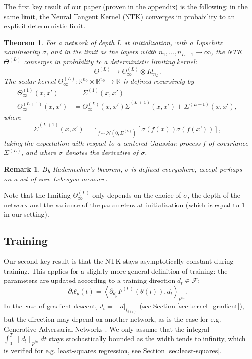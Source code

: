 \documentclass{article}
\newtheorem{thm}{Theorem}
\newtheorem{rem}{Remark}
\begin{document}
The first key result of our paper (proven in the appendix) is the following: in the same limit, the Neural Tangent Kernel (NTK) converges in probability to an explicit deterministic limit. 
\begin{thm}\label{thm:convergence_NTK_initialization}
For a network of depth $L$ at initialization, with a Lipschitz nonlinearity $\sigma$, and in the limit as the layers width $n_1, ..., n_{L-1} \to \infty$, the NTK $\Theta^{(L)}$ converges in probability to a deterministic limiting kernel: $$\Theta^{(L)} \to \Theta^{(L)}_\infty \otimes Id_{n_L}.$$
The scalar kernel $\Theta^{(L)}_\infty : \mathbb{R}^{n_0} \times \mathbb{R}^{n_0} \to \mathbb{R}$ is defined recursively by
\begin{align*}
    \Theta^{(1)}_\infty(x, x') &= \Sigma^{(1)}(x, x') \\
    \Theta^{(L+1)}_\infty(x, x') &=  \Theta^{(L)}_\infty(x, x') \dot{\Sigma}^{(L+1)}(x, x')  + \Sigma^{(L+1)}(x, x'),
\end{align*}
where
\[
	\dot{\Sigma}^{(L+1)}\left(x,x'\right)=
	\mathbb{E}_{f\sim\mathcal{N}\left(0,\Sigma^{\left(L\right)}\right)}\left[\dot{\sigma}\left(f\left(x\right)\right)\dot{\sigma}\left(f\left(x'\right)\right)\right],
\]
taking the expectation with respect to a centered Gaussian process $f$ of covariance $\Sigma^{(L)}$, and where $\dot{\sigma}$ denotes the derivative of $\sigma$.
\end{thm}
\begin{rem}
By Rademacher's theorem, $\dot{\sigma}$ is defined everywhere, except perhaps on a set of zero Lebesgue measure.
\end{rem}

Note that the limiting $\Theta^{(L)}_\infty$ only depends on the choice of $\sigma$, the depth of the network and the variance of the parameters at initialization (which is equal to $1$ in our setting).



\subsection{Training}
Our second key result is that the NTK stays asymptotically constant during training. This applies for a slightly more general definition of training: the parameters are updated according to a training direction $d_t \in \mathcal{F}$:
$$
\partial_t \theta_p(t) = \left< \partial_{\theta_p} F^{(L)}(\theta(t)), d_t \right>_{p^{in}}.
$$
In the case of gradient descent, $d_t = -d|_{f_{\theta(t)}}$ (see Section \ref{sec:kernel_gradient}), but the direction may depend on another network, as is the case for e.g. Generative Adversarial Networks \cite{Goodfellow2014}. We only assume that the integral $\int_0^T \| d_t \|_{p^{in}} dt$ stays stochastically bounded as the width tends to infinity, which is verified for e.g. least-squares regression, see Section \ref{sec:least-squares}.
\end{document}
